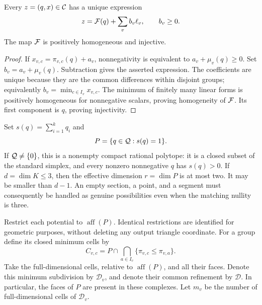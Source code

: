 \begin{lemma}
\label{pl:decomposition}
Every \(z=(q,x)\in\mathcal{C}\) has a unique expression
\[
 z=\mathcal{F}(q)+\sum_v b_v\ell_v,\qquad b_v\geq0.
\]
The map \(\mathcal{F}\) is positively homogeneous and injective.
\end{lemma}
\begin{proof}
If \(x_{v,c}=\pi_{v,c}(q)+a_v\), nonnegativity is equivalent to
\(a_v+\mu_v(q)\geq0\).  Set \(b_v=a_v+\mu_v(q)\).
Subtraction gives the asserted expression.  The coefficients are
unique because they are the common differences within disjoint
groups; equivalently \(b_v=\min_{c\in I_v}x_{v,c}\).
The minimum of finitely many linear forms is positively homogeneous
for nonnegative scalars, proving homogeneity of \(\mathcal{F}\).
Its first component is \(q\), proving injectivity.
\end{proof}

Set \(s(q)=\sum_{i=1}^kq_i\) and
\begin{equation}
 P=\{q\in\mathcal{Q}:s(q)=1\}.
 \label{pl:section}
\end{equation}
If \(\mathcal{Q}\neq\{0\}\), this is a nonempty compact rational polytope:
it is a closed subset of the standard simplex, and every nonzero
nonnegative \(q\) has \(s(q)>0\).  If
\(d=\dim K\leq3\), then the effective dimension
\(r=\dim P\) is at most two.  It may be smaller than \(d-1\).
An empty section, a point, and a segment must consequently be handled
as genuine possibilities even when the matching nullity is three.

Restrict each potential to \(\operatorname{aff}(P)\).  Identical
restrictions are identified for geometric purposes, without deleting
any output triangle coordinate.  For a group define its closed
minimum cells by
\begin{equation}
 C_{v,c}=
 P\cap\bigcap_{a\in I_v}
 \{\pi_{v,c}\leq\pi_{v,a}\}.
 \label{pl:min-cells}
\end{equation}
Take the full-dimensional cells, relative to
\(\operatorname{aff}(P)\), and all their faces.  Denote this minimum
subdivision by \(\mathcal D_v\), and denote their common refinement
by \(\mathcal D\).  In particular, the faces of \(P\) are present in
these complexes.  Let \(m_v\) be the number of full-dimensional
cells of \(\mathcal D_v\).


